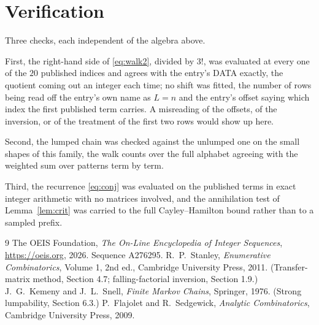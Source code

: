 \documentclass[11pt,a4paper]{article}
\theoremstyle{plain}
\theoremstyle{definition}
\begin{document}
\section{Verification}

Three checks, each independent of the algebra above.

First, the right-hand side of \eqref{eq:walk2}, divided by $3!$, was evaluated at every
one of the $20$ published indices and agrees with the entry's DATA exactly, the quotient
coming out an integer each time; no shift was fitted, the number of rows being read off the
entry's own name as $L=n$ and the entry's offset saying which index the first published
term carries. A misreading of the offsets, of the inversion, or of the treatment of the first
two rows would show up here.

Second, the lumped chain was checked against the unlumped one on the small shapes of this
family, the walk counts over the full alphabet agreeing with the weighted sum over patterns
term by term.

Third, the recurrence \eqref{eq:conj} was evaluated on the published terms in exact integer
arithmetic with no matrices involved, and the annihilation test of Lemma~\ref{lem:crit} was
carried to the full Cayley--Hamilton bound rather than to a sampled prefix.

\begin{thebibliography}{9}
 The OEIS Foundation, \emph{The On-Line Encyclopedia of Integer
Sequences}, \url{https://oeis.org}, 2026. Sequence A276295.
 R.~P.~Stanley, \emph{Enumerative Combinatorics}, Volume 1, 2nd ed.,
Cambridge University Press, 2011. (Transfer-matrix method, Section 4.7; falling-factorial
inversion, Section 1.9.)
 J.~G.~Kemeny and J.~L.~Snell, \emph{Finite Markov Chains}, Springer,
1976. (Strong lumpability, Section 6.3.)
 P.~Flajolet and R.~Sedgewick, \emph{Analytic Combinatorics}, Cambridge
University Press, 2009.
\end{thebibliography}
\end{document}

